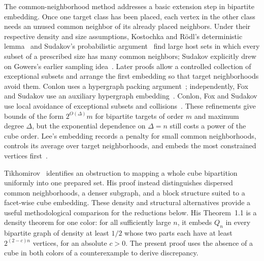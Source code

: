 The common-neighborhood method addresses a basic extension step in
bipartite embedding. Once one target class has been placed, each vertex in
the other class needs an unused common neighbor of its already placed
neighbors. Under their respective density and size assumptions,
Kostochka and R\"odl's deterministic lemma~\cite[Lemma~1]{kostochka-rodl2001}
and Sudakov's probabilistic argument~\cite[Section~2]{sudakov2003} find
large host sets in which every subset of a prescribed size has many common
neighbors; Sudakov explicitly drew on Gowers's earlier sampling idea~\cite[Section~4, Lemma~11]{gowers1998}.
Later proofs allow a controlled
collection of exceptional subsets and arrange the first embedding so that
target neighborhoods avoid them. Conlon uses a hypergraph packing
argument~\cite{conlon2009bipartite}; independently, Fox and Sudakov use an
auxiliary hypergraph embedding~\cite[Lemmas~2.1--2.2]{fox-sudakov2009}.
Conlon, Fox and Sudakov use local avoidance of exceptional subsets and
collisions~\cite[Section~4]{conlon-fox-sudakov2016}.
These refinements give bounds of the form $2^{O(\Delta)}m$ for bipartite
targets of order $m$ and maximum degree $\Delta$, but the exponential
dependence on $\Delta=n$ still costs a power of the cube order.
Lee's embedding records a penalty for small common neighborhoods,
controls its average over target neighborhoods, and embeds the most
constrained vertices first~\cite[Section~2]{lee2017}.

Tikhomirov~\cite[Sections~1, 5 and~6]{tikhomirov2024} identifies an obstruction
to mapping a whole cube bipartition uniformly into one prepared set.
His proof instead distinguishes dispersed common neighborhoods, a denser
subgraph, and a block structure suited to a facet-wise cube embedding.
These density and structural alternatives provide a useful methodological
comparison for the reductions below. His Theorem~1.1 is a density theorem
for one color: for all sufficiently large $n$, it embeds $Q_n$ in every
bipartite graph of density at least $1/2$ whose two parts each have at least
$2^{(2-c)n}$ vertices, for an absolute $c>0$. The present proof uses the
absence of a cube in both colors of a counterexample to derive discrepancy.

